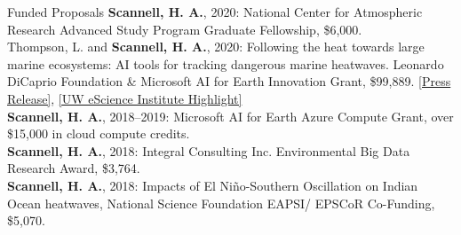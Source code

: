 \documentclass{resume} %
\begin{document}
\begin{rSection}{Funded Proposals}
{\bf Scannell, H. A.}, 2020: {National Center for Atmospheric Research Advanced Study Program Graduate Fellowship}, \$6,000. \\ \indent
Thompson, L. and {\bf Scannell, H. A.}, 2020: Following the heat towards large marine ecosystems: AI tools for tracking dangerous marine heatwaves. {Leonardo DiCaprio Foundation \& Microsoft AI for Earth Innovation Grant}, \$99,889. \href{https://www.globalwildlife.org/press/winners-of-ai-for-earth-innovation-grants-poised-to-address-urgent-environmental-challenges-with-creative-use-of-technology/}{[Press Release]}, \href{https://escience.washington.edu/data-science-to-track-mhws}{[UW eScience Institute Highlight]}\\ \indent
{\bf Scannell, H. A.}, 2018–2019: {Microsoft AI for Earth Azure Compute Grant}, over \$15,000 in cloud compute credits. \\ \indent
{\bf Scannell, H. A.}, 2018: {Integral Consulting Inc. Environmental Big Data Research Award}, \$3,764. \\ \indent
{\bf Scannell, H. A.}, 2018: Impacts of El Niño-Southern Oscillation on Indian Ocean heatwaves, {National Science Foundation EAPSI/ EPSCoR Co-Funding}, \$5,070. \\
\end{rSection}
\newpage
\end{document}
